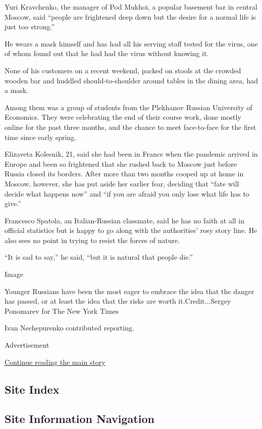 Yuri Kravchenko, the manager of Pod Mukhoi, a popular basement bar in
central Moscow, said ``people are frightened deep down but the desire
for a normal life is just too strong.''

He wears a mask himself and has had all his serving staff tested for the
virus, one of whom found out that he had had the virus without knowing
it.

None of his customers on a recent weekend, packed on stools at the
crowded wooden bar and huddled should-to-shoulder around tables in the
dining area, had a mask.

Among them was a group of students from the Plekhanov Russian University
of Economics. They were celebrating the end of their course work, done
mostly online for the past three months, and the chance to meet
face-to-face for the first time since early spring.

Elizaveta Kolesnik, 21, said she had been in France when the pandemic
arrived in Europe and been so frightened that she rushed back to Moscow
just before Russia closed its borders. After more than two months cooped
up at home in Moscow, however, she has put aside her earlier fear,
deciding that ``fate will decide what happens now'' and ``if you are
afraid you only lose what life has to give.''

Francesco Spatola, an Italian-Russian classmate, said he has no faith at
all in official statistics but is happy to go along with the
authorities' rosy story line. He also sees no point in trying to resist
the forces of nature.

``It is sad to say,'' he said, ``but it is natural that people die.''

Image

Younger Russians have been the most eager to embrace the idea that the
danger has passed, or at least the idea that the risks are worth
it.Credit...Sergey Ponomarev for The New York Times

Ivan Nechepurenko contributed reporting.

Advertisement

\protect\hyperlink{after-bottom}{Continue reading the main story}

\hypertarget{site-index}{%
\subsection{Site Index}\label{site-index}}

\hypertarget{site-information-navigation}{%
\subsection{Site Information
Navigation}\label{site-information-navigation}}

